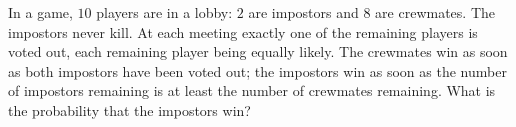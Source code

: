 In a game, $10$ players are in a lobby: $2$ are impostors and $8$ are crewmates. The impostors never kill. At each meeting exactly one of the remaining players is voted out, each remaining player being equally likely. The crewmates win as soon as both impostors have been voted out; the impostors win as soon as the number of impostors remaining is at least the number of crewmates remaining. What is the probability that the impostors win?
